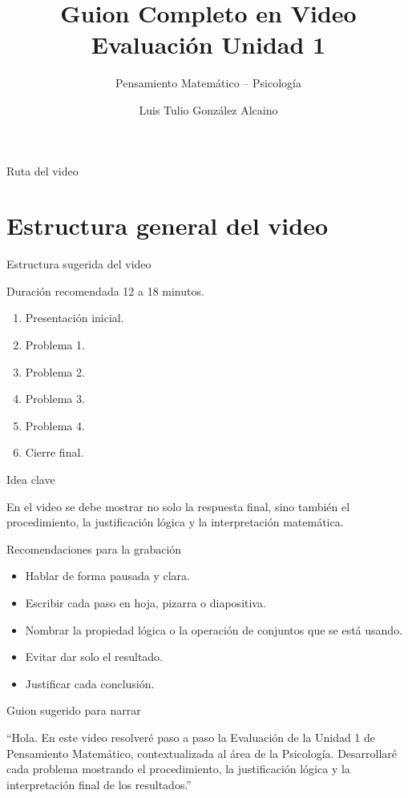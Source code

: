 \documentclass[aspectratio=169,10pt]{beamer}
\title{Guion Completo en Video\\Evaluación Unidad 1}
\subtitle{Pensamiento Matemático -- Psicología}
\author{Luis Tulio González Alcaino}
\institute{Universidad Santo Tomás \\ Departamento de Ciencias Básicas}
\date{}
\newcommand{\IdeaClave}[1]{
	\begin{alertblock}{Idea clave}
		#1
	\end{alertblock}
}
\newcommand{\Guion}[1]{
	\begin{exampleblock}{Guion sugerido para narrar}
		#1
	\end{exampleblock}
}
\begin{document}
	
	\begin{frame}
		\titlepage
	\end{frame}
	
	\begin{frame}{Ruta del video}
		\tableofcontents
	\end{frame}
	
	\section{Estructura general del video}
	
	\begin{frame}{Estructura sugerida del video}
		\begin{block}{Duración recomendada}
			12 a 18 minutos.
		\end{block}
		
		\begin{enumerate}[label=\arabic*.]
			\item Presentación inicial.
			\item Problema 1.
			\item Problema 2.
			\item Problema 3.
			\item Problema 4.
			\item Cierre final.
		\end{enumerate}
		
		\IdeaClave{
			En el video se debe mostrar no solo la respuesta final, sino también el procedimiento, la justificación lógica y la interpretación matemática.
		}
	\end{frame}
	
	\begin{frame}{Recomendaciones para la grabación}
		\begin{itemize}
			\item Hablar de forma pausada y clara.
			\item Escribir cada paso en hoja, pizarra o diapositiva.
			\item Nombrar la propiedad lógica o la operación de conjuntos que se está usando.
			\item Evitar dar solo el resultado.
			\item Justificar cada conclusión.
		\end{itemize}
		
		\Guion{
			``Hola. En este video resolveré paso a paso la Evaluación de la Unidad 1 de Pensamiento Matemático, contextualizada al área de la Psicología. Desarrollaré cada problema mostrando el procedimiento, la justificación lógica y la interpretación final de los resultados.''}
	\end{frame}
	
\end{document}
